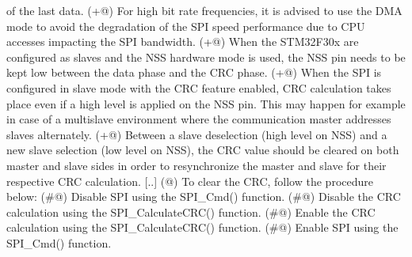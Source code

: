 \begin{DoxyVerb}
              of the last data.
         (+@) For high bit rate frequencies, it is advised to use the DMA mode to avoid the
              degradation of the SPI speed performance due to CPU accesses impacting the 
              SPI bandwidth.
         (+@) When the STM32F30x are configured as slaves and the NSS hardware mode is 
              used, the NSS pin needs to be kept low between the data phase and the CRC 
              phase.
         (+@) When the SPI is configured in slave mode with the CRC feature enabled, CRC
              calculation takes place even if a high level is applied on the NSS pin. 
              This may happen for example in case of a multislave environment where the 
              communication master addresses slaves alternately.
         (+@) Between a slave deselection (high level on NSS) and a new slave selection 
              (low level on NSS), the CRC value should be cleared on both master and slave
              sides in order to resynchronize the master and slave for their respective 
              CRC calculation.
    [..]          
    (@) To clear the CRC, follow the procedure below:
         (#@) Disable SPI using the SPI_Cmd() function.
         (#@) Disable the CRC calculation using the SPI_CalculateCRC() function.
         (#@) Enable the CRC calculation using the SPI_CalculateCRC() function.
         (#@) Enable SPI using the SPI_Cmd() function.\end{DoxyVerb}


